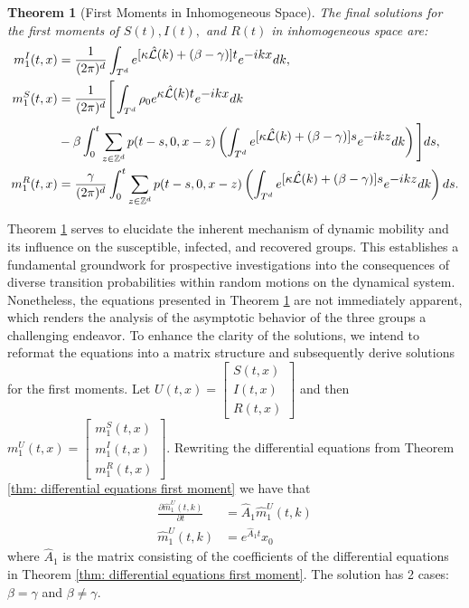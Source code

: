 \documentclass[sn-basic]{sn-jnl}%
\theoremstyle{thmstyleone}%
\newtheorem{theorem}{Theorem}%
\theoremstyle{thmstyletwo}%
\theoremstyle{thmstylethree}%
\numberwithin{equation}{theorem}
\begin{document}
\begin{theorem}[First Moments in Inhomogeneous Space] \label{thm: first moment inhomogeneous space}
The final solutions for the first moments of $S(t),I(t),$ and $R(t)$ in inhomogeneous space are:
\begin{align*}
m_{1}^{I}(t,x) &= \displaystyle \frac{1}{(2 \pi)^{d}} \int_{T^{d}} e^{\displaystyle [\kappa \hat{\mathcal{L}}(k) + (\beta - \gamma)]t} e^{\displaystyle -ikx} dk,\\
m_{1}^{S}(t,x) &= \displaystyle \frac{1}{(2 \pi)^d} \Bigg[ \int_{T^{d}} \rho_{0} e^{\displaystyle \kappa \hat{\mathcal{L}}(k) t} e^{\displaystyle -ikx}dk\\
&-\beta \displaystyle \int_{0}^{t} \sum\limits_{z \in \mathbb{Z}^{d}} \mathnormal{p} (t-s, 0, x-z) \left(\displaystyle \int_{T^{d}} e^{\displaystyle [\kappa \hat{\mathcal{L}}(k) + (\beta - \gamma)]s} e^{\displaystyle -ikz} dk \right)\Bigg] ds,\\
m_{1}^{R}(t,x) &= \displaystyle \frac{\gamma}{(2 \pi)^{d}} \int_{0}^{t} \sum\limits_{z \in \mathbb{Z}^{d}} \mathnormal{p} (t-s, 0, x-z)
\left(\displaystyle  \int_{T^{d}} e^{\displaystyle [\kappa \hat{\mathcal{L}}(k) + (\beta - \gamma)]s} e^{\displaystyle -ikz} dk \right)ds.
\end{align*}
\end{theorem}

Theorem \ref{thm: first moment inhomogeneous space} serves to elucidate the inherent mechanism of dynamic mobility and its influence on the susceptible, infected, and recovered groups. This establishes a fundamental groundwork for prospective investigations into the consequences of diverse transition probabilities within random motions on the dynamical system. Nonetheless, the equations presented in Theorem \ref{thm: first moment inhomogeneous space} are not immediately apparent, which renders the analysis of the asymptotic behavior of the three groups a challenging endeavor. To enhance the clarity of the solutions, we intend to reformat the equations into a matrix structure and subsequently derive solutions for the first moments. Let $U(t,x) = \begin{bmatrix}
S(t,x)\\
I(t,x)\\
R(t,x)
\end{bmatrix}$ and then $m_{1}^{U}(t,x) = \begin{bmatrix}
m_{1}^{S}(t,x)\\
m_{1}^{I}(t,x)\\
m_{1}^{R}(t,x)
\end{bmatrix}$. Rewriting the differential equations from Theorem \ref{thm: differential equations first moment} we have that
\begin{align}
\displaystyle \frac{\partial \hat{m}_{1}^{U}(t,k)}{\partial t} &= \hat{A}_{1} \hat{m}_{1}^{U}(t,k)\\
\hat{m}_{1}^{U}(t,k) &= e^{\displaystyle \hat{A}_{1} t} x_{0}
\end{align}
where $\hat{A}_{1}$ is the matrix consisting of the coefficients of the differential equations in Theorem \ref{thm: differential equations first moment}. The solution has 2 cases: $\beta=\gamma$ and $\beta \neq \gamma$.\\
\end{document}
